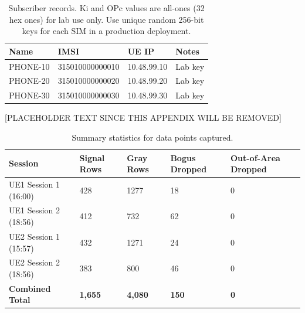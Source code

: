 \documentclass[
    left=1.5in,
    right=1.25in,
    top=1.25in,
    bottom=1.25in
]{CalPolySeniorProject}
\begin{document}
\begin{table}[!ht]
    \centering
    \caption[Subscriber records]{Subscriber records. Ki and OPc values are
    all-ones (32 hex ones) for lab use only. Use unique random 256-bit keys
    for each SIM in a production deployment.}
    \vspace{0.5\baselineskip}
    \begin{tabular}{llll}
        \toprule
        \textbf{Name} & \textbf{IMSI} & \textbf{UE IP} & \textbf{Notes} \\
        \midrule
        PHONE-10 & 315010000000010 & 10.48.99.10 & Lab key \\
        PHONE-20 & 315010000000020 & 10.48.99.20 & Lab key \\
        PHONE-30 & 315010000000030 & 10.48.99.30 & Lab key \\
        \bottomrule
    \end{tabular}
    \label{tab:subs_config}
\end{table}


[PLACEHOLDER TEXT SINCE THIS APPENDIX WILL BE REMOVED]

\begin{table}[!ht]
    \centering
    \caption[Summary Statistics]{Summary statistics for data points captured.}
    \vspace{0.5\baselineskip}
    \begin{tabular}{lllll}
        \toprule
        \textbf{Session} & \textbf{Signal Rows} & \textbf{Gray Rows} & \textbf{Bogus Dropped} & \textbf{Out-of-Area Dropped} \\
        \midrule
        UE1 Session 1 (16:00) & 428 & 1277 & 18 & 0 \\
        UE1 Session 2 (18:56) & 412 & 732 & 62 & 0 \\
        UE2 Session 1 (15:57) & 432 & 1271 & 24 & 0 \\
        UE2 Session 2 (18:56) & 383 & 800 & 46 & 0 \\
        \textbf{Combined Total} & \textbf{1,655} & \textbf{4,080} & \textbf{150} & \textbf{0} \\
        \bottomrule
    \end{tabular}
    \label{tab:sum_stats}
\end{table}
\end{document}
